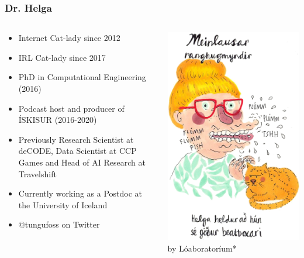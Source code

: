 \begin{frame}
    \frametitle{Dr. Helga}
    \begin{columns}[T]
        \begin{column}{0.55\textwidth}
            \begin{itemize}
                \item Internet Cat-lady since 2012
                \item IRL Cat-lady since 2017
                \item PhD in Computational Engineering (2016)
                \item Podcast host and producer of \'{I}SKISUR (2016-2020)
                \item Previously Research Scientist at deCODE, Data Scientist at CCP Games
                and Head of AI Research at Travelshift
                \item Currently working as a Postdoc at the University of Iceland
                \item @tungufoss on Twitter
            \end{itemize}
        \end{column}
        \begin{column}{0.4\textwidth}
            \centering
            \includegraphics[width=.9\textwidth]{figures/helga}
            by L\'{o}aborator\'{i}um*


\end{column}
\end{columns}
\end{frame}
